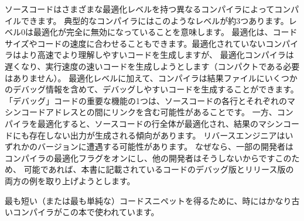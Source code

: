 ソースコードはさまざまな最適化レベルを持つ異なるコンパイラによってコンパイルできます。
典型的なコンパイラにはこのようなレベルが約3つあります。レベル0は最適化が完全に無効になっていることを意味します。
最適化は、コードサイズやコードの速度に合わせることもできます。最適化されていないコンパイラはより高速でより理解しやすいコードを生成しますが、
最適化コンパイラは遅くなり、実行速度の速いコードを生成しようとします（コンパクトである必要はありません）。
最適化レベルに加えて、コンパイラは結果ファイルにいくつかのデバッグ情報を含めて、デバッグしやすいコードを生成することができます。
「デバッグ」コードの重要な機能の1つは、ソースコードの各行とそれぞれのマシンコードアドレスとの間にリンクを含む可能性があることです。
一方、コンパイラを最適化すると、ソースコードの行全体が最適化され、結果のマシンコードにも存在しない出力が生成される傾向があります。
リバースエンジニアはいずれかのバージョンに遭遇する可能性があります。
なぜなら、一部の開発者はコンパイラの最適化フラグをオンにし、他の開発者はそうしないからですこのため、
可能であれば、本書に記載されているコードのデバッグ版とリリース版の両方の例を取り上げようとします。

最も短い（または最も単純な）コードスニペットを得るために、時にはかなり古いコンパイラがこの本で使われています。
